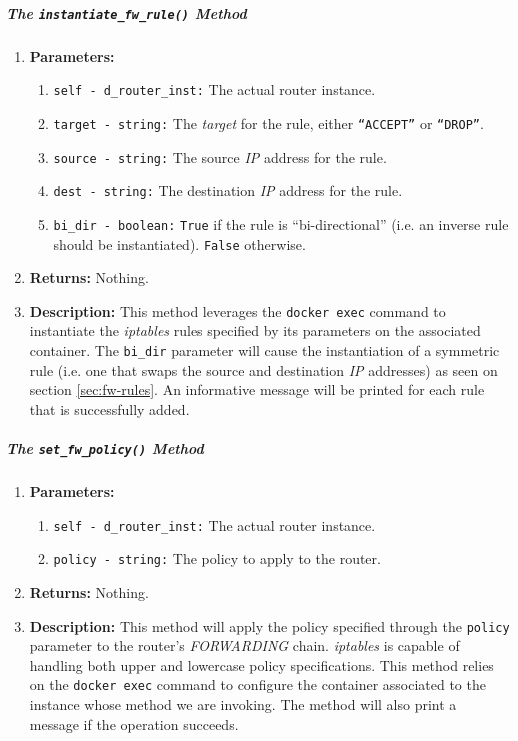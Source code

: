         \subparagraph{The \texttt{instantiate\_fw\_rule()} Method}
            \begin{enumerate}
                \item \textbf{Parameters:}
                \begin{enumerate}
                    \item \texttt{self - d\_router\_inst:} The actual router instance.
                    \item \texttt{target - string:} The \textit{target} for the rule, either \texttt{``ACCEPT''} or \texttt{``DROP''}.
                    \item \texttt{source - string:} The source \textit{IP} address for the rule.
                    \item \texttt{dest - string:} The destination \textit{IP} address for the rule.
                    \item \texttt{bi\_dir - boolean:} \texttt{True} if the rule is ``bi-directional'' (i.e. an inverse rule should be instantiated). \texttt{False} otherwise.
                \end{enumerate}
                \item \textbf{Returns:} Nothing.
                \item \textbf{Description:} This method leverages the \texttt{docker exec} command to instantiate the \textit{iptables} rules specified by its parameters on the associated container. The \texttt{bi\_dir} parameter will cause the instantiation of a symmetric rule (i.e. one that swaps the source and destination \textit{IP} addresses) as seen on section \ref{sec:fw-rules}. An informative message will be printed for each rule that is successfully added.
            \end{enumerate}

        \subparagraph{The \texttt{set\_fw\_policy()} Method}
            \begin{enumerate}
                \item \textbf{Parameters:}
                \begin{enumerate}
                    \item \texttt{self - d\_router\_inst:} The actual router instance.
                    \item \texttt{policy - string:} The policy to apply to the router.
                \end{enumerate}
                \item \textbf{Returns:} Nothing.
                \item \textbf{Description:} This method will apply the policy specified through the \texttt{policy} parameter to the router's \textit{FORWARDING} chain. \textit{iptables} is capable of handling both upper and lowercase policy specifications. This method relies on the \texttt{docker exec} command to configure the container associated to the instance whose method we are invoking. The method will also print a message if the operation succeeds.
            \end{enumerate}

